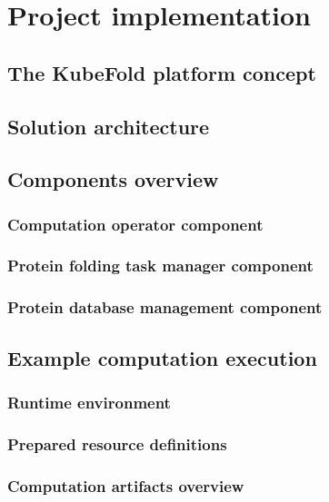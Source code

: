 \chapter{Project implementation}


\section{The KubeFold platform concept}


\section{Solution architecture}


\section{Components overview}

\subsection{Computation operator component}

\subsection{Protein folding task manager component}

\subsection{Protein database management component}


\section{Example computation execution}

\subsection{Runtime environment}

\subsection{Prepared resource definitions}

\subsection{Computation artifacts overview}